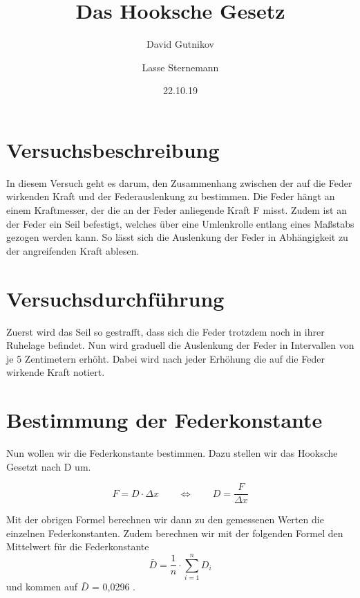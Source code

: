 \documentclass[titlepage = firstcover]{scrartcl}
\title{Das Hooksche Gesetz}
\author{David Gutnikov \and Lasse Sternemann}
\date{22.10.19}
\begin{document}
    \maketitle


    \section{Versuchsbeschreibung}
        In diesem Versuch geht es darum, den Zusammenhang zwischen der auf die Feder wirkenden Kraft und der Federauslenkung zu bestimmen.
        Die Feder hängt an einem Kraftmesser, der die an der Feder anliegende Kraft F misst. Zudem ist an der Feder ein Seil befestigt, 
        welches über eine Umlenkrolle entlang eines Maßstabs gezogen werden kann. So lässt sich die Auslenkung der Feder in Abhängigkeit zu
        der angreifenden Kraft ablesen.

    \section{Versuchsdurchführung}
        Zuerst wird das Seil so gestrafft, dass sich die Feder trotzdem noch in ihrer Ruhelage befindet. Nun wird graduell die Auslenkung der 
        Feder in Intervallen von je 5 Zentimetern erhöht. Dabei wird nach jeder Erhöhung die auf die Feder wirkende Kraft notiert.

        
    \section{Bestimmung der Federkonstante}
        Nun wollen wir die Federkonstante bestimmen. Dazu stellen wir das Hooksche Gesetzt nach D um.

    \begin{equation}
        F = D \cdot \Delta x  \qquad \Leftrightarrow  \qquad D = \frac{F}{\Delta x}
    \end{equation} 

      Mit der obrigen Formel berechnen wir dann zu den gemessenen Werten die einzelnen Federkonstanten.
      Zudem berechnen wir mit der folgenden Formel den Mittelwert für die Federkonstante 
        \begin{equation}
          \bar{D} = \frac{1}{n} \cdot \sum_{i=1}^{n} D_{i}
        \end{equation}  
        und kommen auf $\bar{D}$ = 0,0296 . \\
\end{document}
